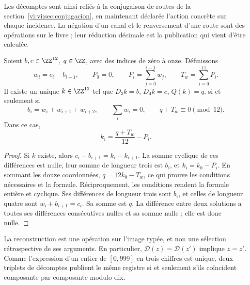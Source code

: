 Les décomptes sont ainsi reliés à la conjugaison de routes de la
section~\ref{vi:vi:sec:conjugacion}, en maintenant déclarée l'action
concrète sur chaque incidence. La négation d'un canal et le renversement
d'une route sont des opérations sur le livre ; leur réduction décimale est la
publication qui vient d'être calculée.

\begin{proposition}
\label{vi:vi:dep:imagen-integral}
Soient \(b,c\in\ZZ^{12}\), \(q\in\ZZ\), avec des indices de zéro à onze.
Définissons
\[
 w_i=c_i-b_{i+1},\qquad P_0=0,\qquad
 P_i=\sum_{j=0}^{i-1}w_j,\qquad T_w=\sum_{i=0}^{11}P_i.
\]
Il existe un unique \(k\in\ZZ^{12}\) tel que
\(D_3k=b\), \(D_4k=c\), \(Q(k)=q\), si et seulement si
\begin{equation}
 b_i=w_i+w_{i+1}+w_{i+2},\qquad
 \sum_iw_i=0,\qquad q+T_w\equiv0\pmod{12}.
 \label{vi:vi:dep:condiciones-imagen}
\end{equation}
Dans ce cas,
\begin{equation}
 k_i=\frac{q+T_w}{12}-P_i.
 \label{vi:vi:dep:inversa-incidencial}
\end{equation}
\end{proposition}
\begin{proof}
Si \(k\) existe, alors
\(c_i-b_{i+1}=k_i-k_{i+1}\). La somme cyclique de ces différences
est nulle, leur somme de longueur trois est \(b_i\), et
\(k_i=k_0-P_i\). En sommant les douze coordonnées,
\(q=12k_0-T_w\), ce qui prouve les conditions nécessaires et la formule.
Réciproquement, les conditions rendent la formule entière et
cyclique. Ses différences de longueur trois sont \(b_i\), et celles de
longueur quatre sont \(w_i+b_{i+1}=c_i\). Sa somme est \(q\).
La différence entre deux solutions a toutes ses différences
consécutives nulles et sa somme nulle ; elle est donc nulle.
\end{proof}

La reconstruction est une opération sur l'image typée, et non une
sélection rétrospective de ses arguments. En particulier,
\(\mathcal D(z)=\mathcal D(z')\) implique \(z=z'\).
Comme l'expression d'un entier de \([0,999]\) en trois chiffres est unique,
deux triplets de décomptes publient le même registre si et seulement s'ils coïncident
composante par composante modulo dix.

